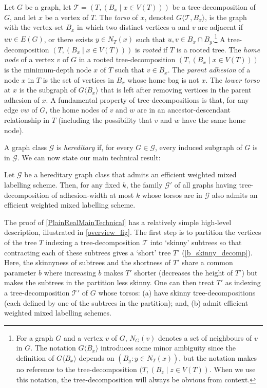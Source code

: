 \documentclass{patmorin}
\newcommand{\vida}[1]{\noindent{\color{pink} VD: #1}}
\newcommand{\pat}[1]{\noindent\textcolor{Magenta}{PaMo: #1}}
\newcommand{\defin}[1]{\emph{\textcolor{brightmaroon}{#1}}}
\newcommand{\torso}[2]{{#1}\langle{#2}\rangle}
\newcommand{\calT}{\mathcal{T}}
\begin{document}
Let $G$ be a graph,
let $\calT=(T,(B_x \mid x\in V(T)))$ be a tree-decomposition of $G$, and let $x$ be a vertex of $T$.
The \defin{torso} of $x$, denoted \defin{$\torso{G}{\mathcal{T},B_x}$},
 is the graph with the vertex-set $B_x$ in which two distinct vertices $u$ and $v$ are adjacent
  if $uv \in E(G)$, or there exists $y \in N_T(x)$  such that $u,v \in B_x \cap B_y$.\footnote{For a graph $G$ and a vertex $v$ of $G$, $N_G(v)$ denotes a set of neighbours of $v$ in $G$. The notation $\torso{G}{B_x}$ introduces some minor ambiguity since the definition of $\torso{G}{B_x}$ depends on $(B_y:y\in N_T(x))$, but the notation makes no reference to the tree-decomposition $(T, (B_z\mid z\in V(T))$.  When we use this notation, the tree-decomposition will always be obvious from context.}
  A tree-decomposition $(T,(B_x \mid x\in V(T)))$ is \defin{rooted} if $T$ is a rooted tree.  The \defin{home node} of a vertex $v$ of $G$ in a rooted tree-decomposition $(T,(B_x \mid x\in V(T)))$ is the minimum-depth node $x$ of $T$ such that $v\in B_x$.  The \defin{parent adhesion} of a node $x$ in $T$ is the set of vertices in $B_x$ whose home bag is not $x$.  The \defin{lower torso} at $x$ is the subgraph of $\torso{G}{B_x}$ that is left after removing vertices in the parent adhesion of $x$. A fundamental property of tree-decompositions is that, for any edge $vw$ of $G$, the home nodes of $v$ and $w$ are in an ancestor-descendant relationship in $T$ (including the possibility that $v$ and $w$ have the same home node).

  A graph class $\mathcal{G}$ is \defin{hereditary} if, for every $G\in\mathcal{G}$, every induced subgraph of $G$ is in $\mathcal{G}$. We can now state our main technical result:
  \begin{thm}\label{PlainRealMainTechnical}
        Let $\mathcal{G}$ be a hereditary graph class that admits an efficient weighted mixed labelling scheme. Then, for any fixed $k$, the family $\mathcal{G}'$ of all graphs having tree-decomposition of adhesion-width at most $k$ whose torsos are in $\mathcal{G}$ also admits an efficient weighted mixed labelling scheme.
  \end{thm}

  The proof of \cref{PlainRealMainTechnical} has a relatively simple high-level description, illustrated in \cref{overview_fig}.  The first step is to partition the vertices of the tree $T$ indexing a tree-decomposition $\mathcal{T}$ into `skinny' subtrees so that contracting each of these subtrees gives a `short' tree $T'$ (\cref{b_skinny_decomp}).  Here, the skinnyness of subtrees and the shortness of $T'$ share a common parameter \defin{$b$} where increasing $b$ makes $T'$ shorter (decreases the height of $T'$) but makes the subtrees in the partition less skinny.  One can then treat $T'$ as indexing a tree-decomposition $\mathcal{T}'$ of $G$ whose torsos: (a) have skinny tree-decompositions (each defined by one of the subtrees in the partition); and, (b) admit efficient weighted mixed labelling schemes.
\end{document}
